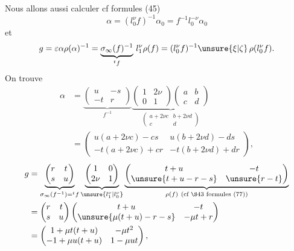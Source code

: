 Nous allons aussi calculer  cf formules (45)
\[
\alpha=(l_0^\nu f)^{-1}\alpha_0=f^{-1}l_0^{-\nu}\alpha_0
\]
et
\[
g=\varepsilon\alpha\rho(\alpha)^{-1}
=\underbrace{\sigma_\infty(f)^{-1}}_{{}^t f}\,l_1^\nu\rho(f)
=(l_0^\nu f)^{-1}\unsure{\xi|\zeta}\,\rho(l_0^\nu f).
\]
On trouve
\[
\tag{64}
\begin{aligned}
\alpha&=\underbrace{\begin{pmatrix}u&-s\\-t&r\end{pmatrix}}_{f^{-1}}
\underbrace{\begin{pmatrix}1&2\nu\\0&1\end{pmatrix}
\begin{pmatrix}a&b\\c&d\end{pmatrix}}_{\begin{pmatrix}a+2\nu c&b+2\nu d\\c&d\end{pmatrix}}\\
&=\begin{pmatrix}u(a+2\nu c)-cs&u(b+2\nu d)-ds\\-t(a+2\nu c)+cr&-t(b+2\nu d)+dr\end{pmatrix},
\end{aligned}
\]
\[
\begin{aligned}
g&=\underbrace{\begin{pmatrix}r&t\\s&u\end{pmatrix}}_{\sigma_\infty(f^{-1})={}^t f}
\underbrace{\begin{pmatrix}1&0\\2\nu&1\end{pmatrix}}_{\unsure{l_1^\nu|l_0^\nu}}
\underbrace{\begin{pmatrix}t+u&-t\\\unsure{t+u-r-s}&\unsure{r-t}\end{pmatrix}}_{\rho(f)\ (\text{cf \S43 formules }(77))}\\
&=\begin{pmatrix}r&t\\s&u\end{pmatrix}
\begin{pmatrix}t+u&-t\\\unsure{\mu(t+u)-r-s}&-\mu t+r\end{pmatrix}\\
&=\begin{pmatrix}1+\mu t(t+u)&-\mu t^2\\-1+\mu u(t+u)&1-\mu ut\end{pmatrix},
\end{aligned}
\]
